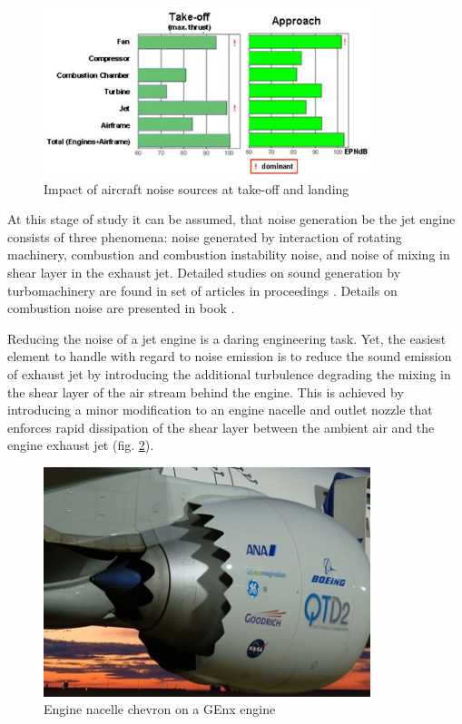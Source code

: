 \begin{figure}[h!]
\centering %
\includegraphics[width=0.85\textwidth]{Pictures/traub2.png}
\caption{Impact of aircraft noise sources at take-off and landing \citep{traub}}
\label{traub2}
\end{figure}

At this stage of study it can be assumed, that noise generation be the jet engine consists of three phenomena: noise generated by interaction of rotating machinery, combustion and combustion instability noise, and noise of mixing in shear layer in the exhaust jet. Detailed studies on sound generation by turbomachinery are found in set of articles in proceedings \cite{tonal}. Details on combustion noise are presented in book \citep{combustion}.

Reducing the noise of a jet engine is a daring engineering task. Yet, the easiest element to handle with regard to noise emission is to reduce the sound emission of exhaust jet by introducing the additional turbulence degrading the mixing in the shear layer of the air stream behind the engine. This is achieved by introducing a minor modification to an engine nacelle and outlet nozzle that enforces rapid dissipation of the shear layer between the ambient air and the engine exhaust jet (fig. \ref{chevron1}). 

\begin{figure}[h!]
\centering %
\includegraphics[width=0.85\textwidth]{Pictures/chevron1.jpg}
\caption{Engine nacelle chevron on a GEnx engine}
\label{chevron1}
\end{figure}

